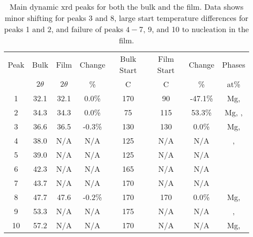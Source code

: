 \documentclass[a4paper,12pt,oneside]{article}%
\begin{document}
\begin{table}[h]
	\centering
	\caption{Main dynamic \gls{xrd} peaks for both the bulk and the film. Data shows minor shifting for peaks 3 and 8, large start temperature differences for peaks 1 and 2, and failure of peaks $4-7$, 9, and 10 to nucleation in the film.}
	\begin{tabular}{ c c c c c c c c }
		\toprule
		Peak & Bulk & Film & Change & Bulk Start & Film Start & Change & Phases \\
		& $2\theta$ & $2\theta$ & \% & \degree C & \degree C & \% & at\% \\
		\midrule
		1    & 32.1 & 32.1 & 0.0\%  & 170 & 90 & -47.1\% & Mg, \MgZn \\
		2    & 34.3 & 34.3 & 0.0\%  & 75  & 115 & 53.3\% & Mg, \MgZn, \CaMgZnFive \\
		3    & 36.6 & 36.5 & -0.3\% & 130 & 130 & 0.0\%  & Mg, \MgZn \\
		4    & 38.0 & N/A  & N/A    & 125 & N/A & N/A    & \MgZn, \CaMgZnFive \\
		5    & 39.0 & N/A  & N/A    & 125 & N/A & N/A    & \MgZn \\
		6    & 42.3 & N/A  & N/A    & 165 & N/A & N/A    & \CaMgZnFive \\
		7    & 43.7 & N/A  & N/A    & 170 & N/A & N/A    & \CaMgZnFive \\
		8    & 47.7 & 47.6 & -0.2\% & 170 & 170 & 0.0\%  & Mg, \MgZn \\
		9    & 53.3 & N/A  & N/A    & 175 & N/A & N/A    & \MgZn, \CaMgZnFive \\
		10   & 57.2 & N/A  & N/A    & 170 & N/A  & N/A   & Mg, \MgZn \\
		\bottomrule
	\end{tabular}
	\label{tab:Dynamic_XRD}
\end{table}
\end{document}
